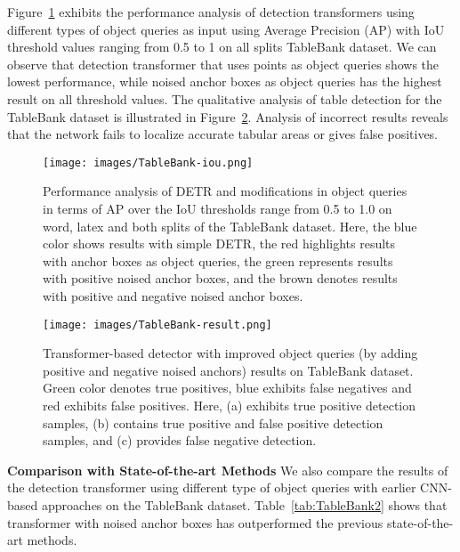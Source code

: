 \documentclass[sn-mathphys]{sn-jnl}\jyear{2021}\theoremstyle{thmstyleone}\newtheorem{theorem}{Theorem}\newtheorem{proposition}[theorem]{Proposition}\theoremstyle{thmstyletwo}\newtheorem{example}{Example}\newtheorem{remark}{Remark}\theoremstyle{thmstylethree}\newtheorem{definition}{Definition}\usepackage{amsmath}
\begin{document}
Figure~\ref{fig:TableBank-iou} exhibits the performance analysis of detection transformers using different types of object queries as input using Average Precision (AP) with IoU threshold values ranging from 0.5 to 1 on all splits TableBank dataset. We can observe that detection transformer that uses points as object queries shows the lowest performance, while noised anchor boxes as object queries has the highest result on all threshold values. The qualitative analysis of table detection for the TableBank dataset is illustrated in Figure~\ref{fig:TableBank-result}. Analysis of incorrect results reveals that the network fails to localize accurate tabular areas or gives false positives.\\
\begin{figure}[h!]
\centering
\texttt{[image: images/TableBank-iou.png]}
\caption{Performance analysis of DETR and modifications in object queries in terms of AP over the IoU thresholds range from 0.5 to 1.0 on word, latex and both splits of the TableBank dataset. Here, the blue color shows results with simple DETR, the red highlights results with anchor boxes as object queries, the green represents results with positive noised anchor boxes, and the brown denotes results with positive and negative noised anchor boxes.}\label{fig:TableBank-iou}
\end{figure}

\begin{figure}[h!]
\centering
\texttt{[image: images/TableBank-result.png]}
\caption{Transformer-based detector with improved object queries (by adding positive and negative noised anchors) results on TableBank dataset. Green color denotes true positives, blue exhibits false negatives and red exhibits false positives. Here, (a) exhibits true positive detection samples, (b) contains true positive and false positive detection samples, and (c) provides false negative detection.}\label{fig:TableBank-result}
\end{figure}




\noindent\textbf{Comparison with State-of-the-art Methods}
We also compare the results of the detection transformer using different type of object queries with earlier CNN-based approaches on the TableBank dataset. Table~\ref{tab:TableBank2} shows that transformer with noised anchor boxes has outperformed the previous state-of-the-art methods.  \par
\end{document}
